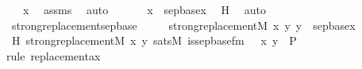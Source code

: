 \begin{isabellebody}
\ {\isachardoublequoteopen}{\isachardot}{\kern0pt}{\isachardot}{\kern0pt}{\isachardot}{\kern0pt}\ {\isacharequal}{\kern0pt}\ x{\isachardoublequoteclose}\ \isamarkupfalse%
\ assms\ \isamarkupfalse%
\ auto\ \isanewline
\isanewline
\ \ \isamarkupfalse%
\ \isamarkupfalse%
\ {\isachardoublequoteopen}x\ {\isasymin}\ sep{\isacharunderscore}{\kern0pt}base{\isacharparenleft}{\kern0pt}x{}{\isacharparenright}{\kern0pt}{\isachardoublequoteclose}\ \isamarkupfalse%
\ H{}\ \isamarkupfalse%
\ auto\isanewline
{}\isamarkupfalse%
%
\endisatagproof
{\isafoldproof}%
%
\isadelimproof
\isanewline
%
\endisadelimproof
\isanewline
{}\isamarkupfalse%
\ strong{\isacharunderscore}{\kern0pt}replacement{\isacharunderscore}{\kern0pt}sep{\isacharunderscore}{\kern0pt}base\ {\isacharcolon}{\kern0pt}\ \isanewline
\ \ \ {\isachardoublequoteopen}strong{\isacharunderscore}{\kern0pt}replacement{\isacharparenleft}{\kern0pt}{\isacharhash}{\kern0pt}{\isacharhash}{\kern0pt}M{\isacharcomma}{\kern0pt}\ {\isasymlambda}x\ y{\isachardot}{\kern0pt}\ y\ {\isacharequal}{\kern0pt}\ sep{\isacharunderscore}{\kern0pt}base{\isacharparenleft}{\kern0pt}x{\isacharparenright}{\kern0pt}{\isacharparenright}{\kern0pt}{\isachardoublequoteclose}\ \isanewline
%
\isadelimproof
%
\endisadelimproof
%
\isatagproof
{}\isamarkupfalse%
\ {\isacharminus}{\kern0pt}\isanewline
\ \ \isamarkupfalse%
\ H{\isacharcolon}{\kern0pt}\ {\isachardoublequoteopen}strong{\isacharunderscore}{\kern0pt}replacement{\isacharparenleft}{\kern0pt}{\isacharhash}{\kern0pt}{\isacharhash}{\kern0pt}M{\isacharcomma}{\kern0pt}\ {\isasymlambda}x\ y{\isachardot}{\kern0pt}\ sats{\isacharparenleft}{\kern0pt}M{\isacharcomma}{\kern0pt}\ is{\isacharunderscore}{\kern0pt}sep{\isacharunderscore}{\kern0pt}base{\isacharunderscore}{\kern0pt}fm{\isacharparenleft}{\kern0pt}{}{\isacharcomma}{\kern0pt}\ {}{\isacharcomma}{\kern0pt}\ {}{\isacharparenright}{\kern0pt}{\isacharcomma}{\kern0pt}\ {\isacharbrackleft}{\kern0pt}x{\isacharcomma}{\kern0pt}\ y{\isacharbrackright}{\kern0pt}\ {\isacharat}{\kern0pt}\ {\isacharbrackleft}{\kern0pt}P{\isacharbrackright}{\kern0pt}{\isacharparenright}{\kern0pt}{\isacharparenright}{\kern0pt}{\isachardoublequoteclose}\ \isanewline
\ \ \ \ \isamarkupfalse%
{\isacharparenleft}{\kern0pt}rule\ replacement{\isacharunderscore}{\kern0pt}ax{\isacharparenright}{\kern0pt}\isanewline
\ \ \ \ \ \ \isamarkupfalse%

\end{isabellebody}

